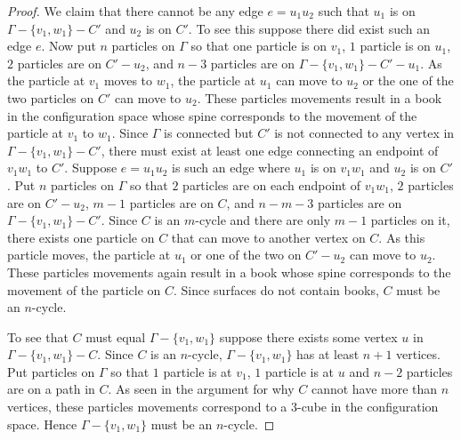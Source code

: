 \begin{proof}
We claim that there cannot be any edge \(e = u_1 u_2\) such that \(u_1\) is on \(\Gamma - \{v_1, w_1\} - C'\) and \(u_2\) is on \(C'\).
To see this suppose there did exist such an edge \(e\).
Now put \(n\) particles on \(\Gamma\) so that one particle is on \(v_1\), \(1\) particle is on \(u_1\), \(2\) particles are on \(C' - u_2\), 
and \(n - 3\) particles are on \(\Gamma - \{v_1, w_1\} - C' - u_1\).
As the particle at \(v_1\) moves to \(w_1\), the particle at \(u_1\) can move to \(u_2\) or the one of the two particles on \(C'\) can move to \(u_2\).
These particles movements result in a book in the configuration space whose spine corresponds to the movement of the particle at \(v_1\) to \(w_1\).
Since \(\Gamma\) is connected but \(C'\) is not connected to any vertex in \(\Gamma - \{v_1, w_1\} - C'\),
there must exist at least one edge connecting an endpoint of \(v_1 w_1\) to \(C'\).
Suppose \(e = u_1 u_2\) is such an edge where \(u_1\) is on \(v_1 w_1\) and \(u_2\) is on \(C'\).
Put \(n\) particles on \(\Gamma\) so that \(2\) particles are on each endpoint of \(v_1 w_1\), \(2\) particles are on \(C' - u_2\), \(m - 1\) particles are on \(C\),
and \(n - m - 3\) particles are on \(\Gamma - \{v_1, w_1\} - C'\).
Since \(C\) is an \(m\)-cycle and there are only \(m - 1\) particles on it, there exists one particle on \(C\) that can move to another vertex on \(C\).
As this particle moves, the particle at \(u_1\) or one of the two on \(C' - u_2\) can move to \(u_2\).
These particles movements again result in a book whose spine corresponds to the movement of the particle on \(C\).
Since surfaces do not contain books, \(C\) must be an \(n\)-cycle.

To see that \(C\) must equal \(\Gamma - \{v_1, w_1\}\) suppose there exists some vertex \(u\) in \(\Gamma - \{v_1, w_1\} - C\).
Since \(C\) is an \(n\)-cycle, \(\Gamma - \{v_1, w_1\}\) has at least \(n + 1\) vertices.
Put particles on \(\Gamma\) so that \(1\) particle is at \(v_1\), \(1\) particle is at \(u\) and \(n-2\) particles are on a path in \(C\).
As seen in the argument for why \(C\) cannot have more than \(n\) vertices, these particles movements correspond to a \(3\)-cube in the configuration
space. Hence \(\Gamma - \{v_1, w_1\}\) must be an \(n\)-cycle.
\end{proof}

